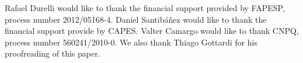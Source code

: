 Rafael Durelli would like to thank the financial support provided by FAPESP, process number 2012/05168-4. Daniel Santib\'a\~nez would like to thank the financial support provide by CAPES. Valter Camargo would like to thank CNPQ, process number 560241/2010-0. We also thank Thiago Gottardi for his proofreading of this paper.